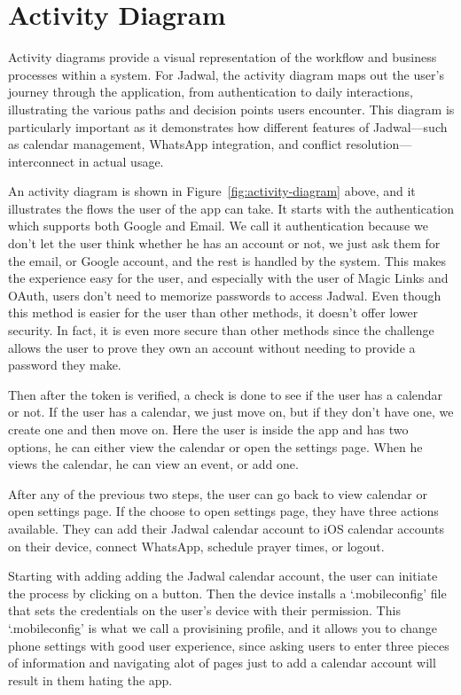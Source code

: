 \section{Activity Diagram}

Activity diagrams provide a visual representation of the workflow and business processes within a system. For Jadwal, the activity diagram maps out the user's journey through the application, from authentication to daily interactions, illustrating the various paths and decision points users encounter. This diagram is particularly important as it demonstrates how different features of Jadwal—such as calendar management, WhatsApp integration, and conflict resolution—interconnect in actual usage.

An activity diagram is shown in Figure~\ref{fig:activity-diagram} above, and it illustrates the flows the user of the app can take. It starts with the authentication which supports both Google and Email. We call it authentication because we don't let the user think whether he has an account or not, we just ask them for the email, or Google account, and the rest is handled by the system. This makes the experience easy for the user, and especially with the user of Magic Links and OAuth, users don't need to memorize passwords to access Jadwal. Even though this method is easier for the user than other methods, it doesn't offer lower security. In fact, it is even more secure than other methods since the challenge allows the user to prove they own an account without needing to provide a password they make.

Then after the token is verified, a check is done to see if the user has a calendar or not. If the user has a calendar, we just move on, but if they don't have one, we create one and then move on. Here the user is inside the app and has two options, he can either view the calendar or open the settings page. When he views the calendar, he can view an event, or add one.

After any of the previous two steps, the user can go back to view calendar or open settings page. If the choose to open settings page, they have three actions available. They can add their Jadwal calendar account to iOS calendar accounts on their device, connect WhatsApp, schedule prayer times, or logout. 

Starting with adding adding the Jadwal calendar account, the user can initiate the process by clicking on a button. Then the device installs a `.mobileconfig' file that sets the credentials on the user's device with their permission. This `.mobileconfig' is what we call a provisining profile, and it allows you to change phone settings with good user experience, since asking users to enter three pieces of information and navigating alot of pages just to add a calendar account will result in them hating the app.

